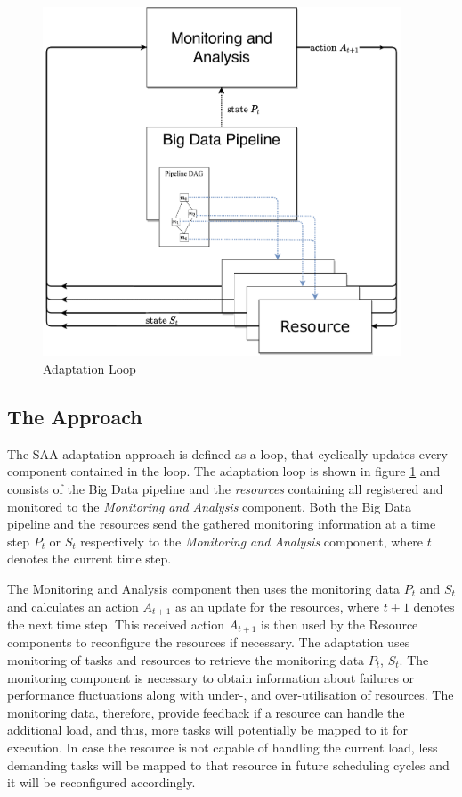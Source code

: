   \begin{figure}[h!]
      \centering
      \includegraphics[width=0.95\textwidth]{figures/monitoring_with_inner_resources.drawio.pdf}
      \caption{Adaptation Loop}
      \label{fig:adaptation-loop}
  \end{figure}

  \subsection{The Approach}

  The SAA adaptation approach is defined as a loop, that cyclically updates every component contained in the loop.
  The adaptation loop is shown in figure \ref{fig:adaptation-loop} and consists of the Big Data pipeline and the \emph{resources} containing all registered and monitored to the \emph{Monitoring and Analysis} component. 
  Both the Big Data pipeline and the resources send the gathered monitoring information at a time step $P_t$ or $S_t$ respectively to the \emph{Monitoring and Analysis} component, where $t$ denotes the current time step.

  The Monitoring and Analysis component then uses the monitoring data $P_t$ and $S_t$ and calculates an action $A_{t+1}$ as an update for the resources, where $t+1$ denotes the next time step.
  This received action $A_{t+1}$ is then used by the Resource components to reconfigure the resources if necessary.
  The adaptation uses monitoring of tasks and resources to retrieve the monitoring data $P_t$, $S_t$.
  The monitoring component is necessary to obtain information about failures or performance fluctuations along with under-, and over-utilisation of resources.
  The monitoring data, therefore, provide feedback if a resource can handle the additional load, and thus, more tasks will potentially be mapped to it for execution. 
  In case the resource is not capable of handling the current load, less demanding tasks will be mapped to that resource in future scheduling cycles and it will be reconfigured accordingly.

